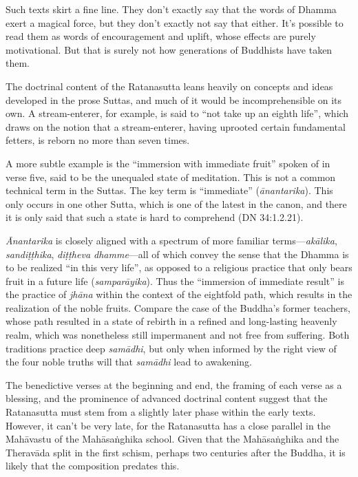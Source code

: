\documentclass[12pt,openany]{book}%
\begin{document}
Such texts skirt a fine line. They don’t exactly say that the words of Dhamma exert a magical force, but they don’t exactly not say that either. It’s possible to read them as words of encouragement and uplift, whose effects are purely motivational. But that is surely not how generations of Buddhists have taken them.

The doctrinal content of the Ratanasutta leans heavily on concepts and ideas developed in the prose Suttas, and much of it would be incomprehensible on its own. A stream-enterer, for example, is said to “not take up an eighth life”, which draws on the notion that a stream-enterer, having uprooted certain fundamental fetters, is reborn no more than seven times.

A more subtle example is the “immersion with immediate fruit” spoken of in verse five, said to be the unequaled state of meditation. This is not a common technical term in the Suttas. The key term is “immediate” (\textit{\textsanskrit{ānantarika}}). This only occurs in one other Sutta, which is one of the latest in the canon, and there it is only said that such a state is hard to comprehend (DN 34:1.2.21).

\textit{Ānantarika} is closely aligned with a spectrum of more familiar terms—\textit{\textsanskrit{akālika}}, \textit{\textsanskrit{sandiṭṭhika}}, \textit{\textsanskrit{diṭṭheva} dhamme}—all of which convey the sense that the Dhamma is to be realized “in this very life”, as opposed to a religious practice that only bears fruit in a future life (\textit{\textsanskrit{samparāyika}}). Thus the “immersion of immediate result” is the practice of \textit{\textsanskrit{jhāna}} within the context of the eightfold path, which results in the realization of the noble fruits. Compare the case of the Buddha’s former teachers, whose path resulted in a state of rebirth in a refined and long-lasting heavenly realm, which was nonetheless still impermanent and not free from suffering. Both traditions practice deep \textit{\textsanskrit{samādhi}}, but only when informed by the right view of the four noble truths will that \textit{\textsanskrit{samādhi}} lead to awakening.

The benedictive verses at the beginning and end, the framing of each verse as a blessing, and the prominence of advanced doctrinal content suggest that the Ratanasutta must stem from a slightly later phase within the early texts. However, it can’t be very late, for the Ratanasutta has a close parallel in the \textsanskrit{Mahāvastu} of the \textsanskrit{Mahāsaṅghika} school. Given that the \textsanskrit{Mahāsaṅghika} and the \textsanskrit{Theravāda} split in the first schism, perhaps two centuries after the Buddha, it is likely that the composition predates this.
\end{document}
